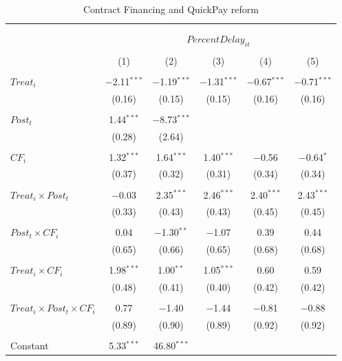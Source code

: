\documentclass[
]{article}
\begin{document}
\begin{table}[H] \centering 
  \caption{Contract Financing and QuickPay reform} 
  \label{} 
\small 
\begin{tabular}{@{\extracolsep{-2pt}}lccccc} 
\\[-1.8ex]\hline 
\hline \\[-1.8ex] 
\\[-1.8ex] & \multicolumn{5}{c}{$PercentDelay_{it}$  } \\ 
\\[-1.8ex] & (1) & (2) & (3) & (4) & (5)\\ 
\hline \\[-1.8ex] 
 $Treat_i$ & $-$2.11$^{***}$ & $-$1.19$^{***}$ & $-$1.31$^{***}$ & $-$0.67$^{***}$ & $-$0.71$^{***}$ \\ 
  & (0.16) & (0.15) & (0.15) & (0.16) & (0.16) \\ 
  & & & & & \\ 
 $Post_t$ & 1.44$^{***}$ & $-$8.73$^{***}$ &  &  &  \\ 
  & (0.28) & (2.64) &  &  &  \\ 
  & & & & & \\ 
 $CF_i$ & 1.32$^{***}$ & 1.64$^{***}$ & 1.40$^{***}$ & $-$0.56 & $-$0.64$^{*}$ \\ 
  & (0.37) & (0.32) & (0.31) & (0.34) & (0.34) \\ 
  & & & & & \\ 
 $Treat_i \times Post_t$ & $-$0.03 & 2.35$^{***}$ & 2.46$^{***}$ & 2.40$^{***}$ & 2.43$^{***}$ \\ 
  & (0.33) & (0.43) & (0.43) & (0.45) & (0.45) \\ 
  & & & & & \\ 
 $Post_t \times CF_i$ & 0.04 & $-$1.30$^{**}$ & $-$1.07 & 0.39 & 0.44 \\ 
  & (0.65) & (0.66) & (0.65) & (0.68) & (0.68) \\ 
  & & & & & \\ 
 $Treat_i \times CF_i$ & 1.98$^{***}$ & 1.00$^{**}$ & 1.05$^{***}$ & 0.60 & 0.59 \\ 
  & (0.48) & (0.41) & (0.40) & (0.42) & (0.42) \\ 
  & & & & & \\ 
 $Treat_i \times Post_t \times CF_i$ & 0.77 & $-$1.40 & $-$1.44 & $-$0.81 & $-$0.88 \\ 
  & (0.89) & (0.90) & (0.89) & (0.92) & (0.92) \\ 
  & & & & & \\ 
 Constant & 5.33$^{***}$ & 46.80$^{***}$ &  &  &  \\ 

\end{tabular}
\end{table}
\end{document}
